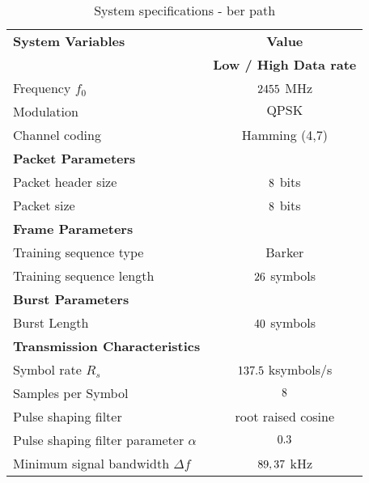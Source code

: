 \begin{table}[htbp]
  \centering
  \caption{System specifications - ber path}
    \begin{tabular}{lc}
    \rowcolor[rgb]{ 0,  0,  0} \textcolor[rgb]{ 1,  1,  1}{\textbf{System Variables}}	& \textcolor[rgb]{ 1,  1,  1}{\textbf{Value}} 		\\
    \rowcolor[rgb]{ 0,  0,  0} \textcolor[rgb]{ 1,  1,  1}{} & \textcolor[rgb]{ 1,  1,  1}{\textbf{Low / High Data rate}} 				\\
    	Frequency $f_0$ 								& $2455$ MHz 							\\
    	Modulation 									& $\text{QPSK}$									\\
    	Channel coding 								& Hamming (4,7) 									\\

    \rowcolor[rgb]{ 0,  0,  0} \textcolor[rgb]{ 1,  1,  1}{\textbf{Packet Parameters}} & \textcolor[rgb]{ 1,  1,  1}{} 				\\
	Packet header size      							& $8 $  bits								\\
    	Packet size									& $8$  bits					 			\\
    
    \rowcolor[rgb]{ 0,  0,  0} \textcolor[rgb]{ 1,  1,  1}{\textbf{Frame Parameters}} & \textcolor[rgb]{ 1,  1,  1}{} 				\\
    	Training sequence type 							& Barker										 	\\
    	Training sequence length							& $26$ symbols 					 		\\
	
    \rowcolor[rgb]{ 0,  0,  0} \textcolor[rgb]{ 1,  1,  1}{\textbf{Burst Parameters}} & \textcolor[rgb]{ 1,  1,  1}{} 					\\
    	Burst Length									& $40 $ symbols							\\
	
    \rowcolor[rgb]{ 0,  0,  0} \textcolor[rgb]{ 1,  1,  1}{\textbf{Transmission Characteristics}} & \textcolor[rgb]{ 1,  1,  1}{} 		\\
    	Symbol rate $R_s$ 								& $137.5$ ksymbols/s 						\\
    	Samples per Symbol 					& $8$													\\

    	Pulse shaping filter 								& root raised cosine 									\\
    	Pulse shaping filter parameter $\alpha$ 				& $0.3$											\\
    	Minimum signal bandwidth $\Delta f$ 				& $89,37$ kHz 					\\
    \end{tabular}
  \label{tab:specs_ber}
\end{table}


